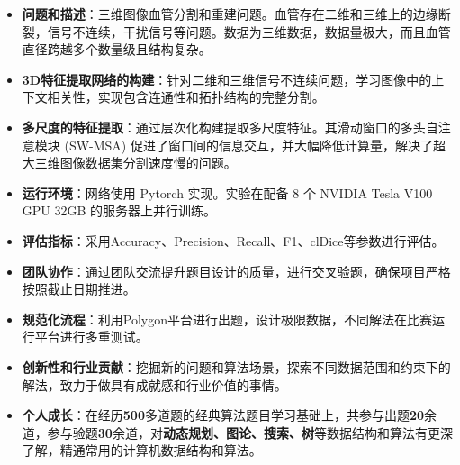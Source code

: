 \documentclass{resume}
\begin{document}
\begin{itemize}	
	\item \textbf{问题和描述}：三维图像血管分割和重建问题。血管存在二维和三维上的边缘断裂，信号不连续，干扰信号等问题。数据为三维数据，数据量极大，而且血管直径跨越多个数量级且结构复杂。
	\item \textbf{3D特征提取网络的构建}：针对二维和三维信号不连续问题，学习图像中的上下文相关性，实现包含连通性和拓扑结构的完整分割。
	\item \textbf{多尺度的特征提取}：通过层次化构建提取多尺度特征。其滑动窗口的多头自注意模块 (SW-MSA) 促进了窗口间的信息交互，并大幅降低计算量，解决了超大三维图像数据集分割速度慢的问题。
	\item \textbf{运行环境}：网络使用 Pytorch 实现。实验在配备 8 个 NVIDIA Tesla V100 GPU 32GB 的服务器上并行训练。
	\item \textbf{评估指标}：采用Accuracy、Precision、Recall、F1、clDice等参数进行评估。
\end{itemize}

\begin{itemize}
	\item \textbf{团队协作}：通过团队交流提升题目设计的质量，进行交叉验题，确保项目严格按照截止日期推进。
	\item \textbf{规范化流程}：利用Polygon平台进行出题，设计极限数据，不同解法在比赛运行平台进行多重测试。
	\item \textbf{创新性和行业贡献}：挖掘新的问题和算法场景，探索不同数据范围和约束下的解法，致力于做具有成就感和行业价值的事情。
	\item \textbf{个人成长}：在经历\textbf{500}多道题的经典算法题目学习基础上，共参与出题\textbf{20}余道，参与验题\textbf{30}余道，对\textbf{动态规划、图论、搜索、树}等数据结构和算法有更深了解，精通常用的计算机数据结构和算法。
\end{itemize}

\end{document}
